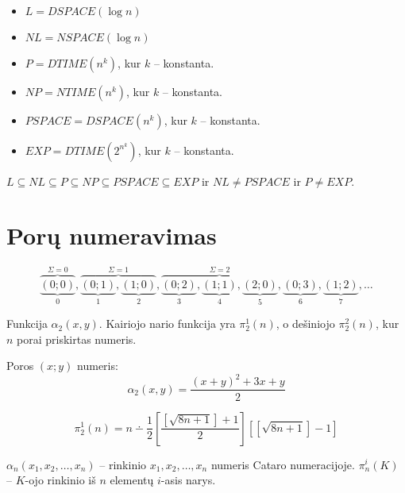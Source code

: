 \begin{defn}
  \hfill \\
  \begin{itemize}
    \item $L = DSPACE(\log n)$
    \item $NL = NSPACE(\log n)$
    \item $P = DTIME(n^k)$, kur $k$ – konstanta.
    \item $NP = NTIME(n^k)$, kur $k$ – konstanta.
    \item $PSPACE = DSPACE(n^k)$, kur $k$ – konstanta.
    \item $EXP = DTIME(2^{n^{k}})$, kur $k$ – konstanta.
  \end{itemize}
\end{defn}

\begin{prop}
  $L \subseteq NL \subseteq P \subseteq NP %
    \subseteq PSPACE \subseteq EXP$
  ir $NL \not = PSPACE$ ir $P \not = EXP$.
\end{prop}

\section{Porų numeravimas}

\[
\overbrace{\underbrace{(0;0)}_{0}}^{\Sigma = 0},%
\overbrace{\underbrace{(0;1)}_{1},\underbrace{(1;0)}_{2}}^{\Sigma = 1},%
\overbrace{\underbrace{(0;2)}_{3},\underbrace{(1;1)}_{4},
  \underbrace{(2;0)}_{5}}^{\Sigma = 2},
  \underbrace{(0;3)}_{6},\underbrace{(1;2)}_{7},\dotsc
\]

\begin{defn}
  Funkcija $\alpha _{2}(x, y)$. Kairiojo nario funkcija yra 
  $\pi_{2}^{1}(n)$, o dešiniojo $\pi_{2}^{2}(n)$, kur $n$ porai priskirtas
  numeris.
\end{defn}

\begin{prop}
  Poros $(x; y)$ numeris:
  \[
  \alpha _{2} (x, y) = \frac{(x+y)^{2} + 3x + y}{2}
  \]
  \begin{note}
    \[
    \pi^{1}_{2} (n) = n \dotminus \frac{1}{2}%
    \left[\frac{[\sqrt{8n + 1}]+1}{2}\right]%
    \left[ [\sqrt{8n + 1}] - 1 \right]
    \]
  \end{note}
\end{prop}

\begin{defn}
  $\alpha_{n}(x_1,x_2,\dotsc,x_n)$ – rinkinio $x_1,x_2,\dotsc,x_n$ numeris
  Cataro numeracijoje.
  $\pi^{i}_{n} (K)$ – $K$-ojo rinkinio iš $n$ elementų $i$-asis narys.
\end{defn}

